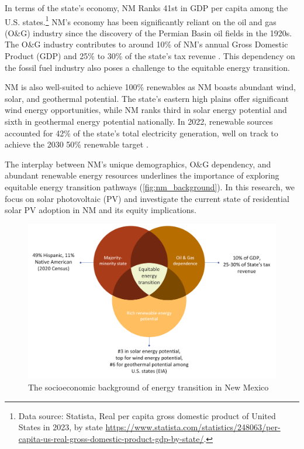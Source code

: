 \documentclass[11pt,twoside,letterpaper]{article}
\begin{document}
In terms of the state's economy, NM Ranks 41st in GDP per capita among the U.S. states.\footnote{Data source: Statista, Real per capita gross domestic product of United States in 2023, by state \url{https://www.statista.com/statistics/248063/per-capita-us-real-gross-domestic-product-gdp-by-state/}.} NM's economy has been significantly reliant on the oil and gas (O\&G) industry since the discovery of the Permian Basin oil fields in the 1920s. The O\&G industry contributes to around 10\% of NM's annual Gross Domestic Product (GDP) and 25\% to 30\% of the state's tax revenue \parencite{eia2023nm, nmlegislative2023}. This dependency on the fossil fuel industry also poses a challenge to the equitable energy transition.

NM is also well-suited to achieve 100\% renewables as NM boasts abundant wind, solar, and geothermal potential. The state's eastern high plains offer significant wind energy opportunities, while NM ranks third in solar energy potential and sixth in geothermal energy potential nationally. In 2022, renewable sources accounted for 42\% of the state's total electricity generation, well on track to achieve the 2030 50\% renewable target \parencite{eia2023energy}.

The interplay between NM's unique demographics, O\&G dependency, and abundant renewable energy resources underlines the importance of exploring equitable energy transition pathways (\autoref{fig:nm_background}). In this research, we focus on solar photovoltaic (PV) and investigate the current state of residential solar PV adoption in NM and its equity implications. 

\begin{figure}[!ht]
    \centering
    \includegraphics[width=1\textwidth]{figures/nm_background.png}
    \caption{The socioeconomic background of energy transition in New Mexico}
    \label{fig:nm_background}
\end{figure}
\end{document}
